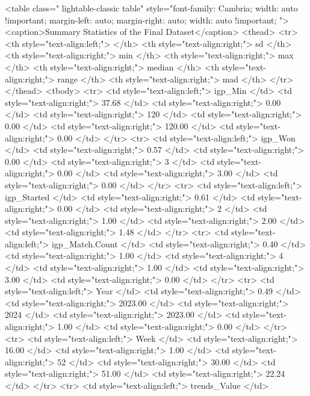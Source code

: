 <table class=" lightable-classic table" style="font-family: Cambria; width: auto !important; margin-left: auto; margin-right: auto; width: auto !important; ">
<caption>Summary Statistics of the Final Dataset</caption>
 <thead>
  <tr>
   <th style="text-align:left;">   </th>
   <th style="text-align:right;"> sd </th>
   <th style="text-align:right;"> min </th>
   <th style="text-align:right;"> max </th>
   <th style="text-align:right;"> median </th>
   <th style="text-align:right;"> range </th>
   <th style="text-align:right;"> mad </th>
  </tr>
 </thead>
<tbody>
  <tr>
   <td style="text-align:left;"> igp_Min </td>
   <td style="text-align:right;"> 37.68 </td>
   <td style="text-align:right;"> 0.00 </td>
   <td style="text-align:right;"> 120 </td>
   <td style="text-align:right;"> 0.00 </td>
   <td style="text-align:right;"> 120.00 </td>
   <td style="text-align:right;"> 0.00 </td>
  </tr>
  <tr>
   <td style="text-align:left;"> igp_Won </td>
   <td style="text-align:right;"> 0.57 </td>
   <td style="text-align:right;"> 0.00 </td>
   <td style="text-align:right;"> 3 </td>
   <td style="text-align:right;"> 0.00 </td>
   <td style="text-align:right;"> 3.00 </td>
   <td style="text-align:right;"> 0.00 </td>
  </tr>
  <tr>
   <td style="text-align:left;"> igp_Started </td>
   <td style="text-align:right;"> 0.61 </td>
   <td style="text-align:right;"> 0.00 </td>
   <td style="text-align:right;"> 2 </td>
   <td style="text-align:right;"> 1.00 </td>
   <td style="text-align:right;"> 2.00 </td>
   <td style="text-align:right;"> 1.48 </td>
  </tr>
  <tr>
   <td style="text-align:left;"> igp_Match.Count </td>
   <td style="text-align:right;"> 0.40 </td>
   <td style="text-align:right;"> 1.00 </td>
   <td style="text-align:right;"> 4 </td>
   <td style="text-align:right;"> 1.00 </td>
   <td style="text-align:right;"> 3.00 </td>
   <td style="text-align:right;"> 0.00 </td>
  </tr>
  <tr>
   <td style="text-align:left;"> Year </td>
   <td style="text-align:right;"> 0.49 </td>
   <td style="text-align:right;"> 2023.00 </td>
   <td style="text-align:right;"> 2024 </td>
   <td style="text-align:right;"> 2023.00 </td>
   <td style="text-align:right;"> 1.00 </td>
   <td style="text-align:right;"> 0.00 </td>
  </tr>
  <tr>
   <td style="text-align:left;"> Week </td>
   <td style="text-align:right;"> 16.00 </td>
   <td style="text-align:right;"> 1.00 </td>
   <td style="text-align:right;"> 52 </td>
   <td style="text-align:right;"> 30.00 </td>
   <td style="text-align:right;"> 51.00 </td>
   <td style="text-align:right;"> 22.24 </td>
  </tr>
  <tr>
   <td style="text-align:left;"> trends_Value </td>
